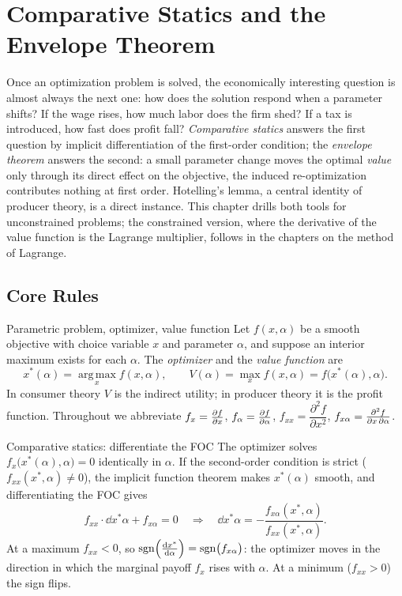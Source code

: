 \chapter{Comparative Statics and the Envelope Theorem}

Once an optimization problem is solved, the economically interesting
question is almost always the next one: how does the solution respond when
a parameter shifts? If the wage rises, how much labor does the firm shed?
If a tax is introduced, how fast does profit fall? \emph{Comparative
statics} answers the first question by implicit
differentiation of the first-order condition; the \emph{envelope theorem} answers the second: a small parameter change
moves the optimal \emph{value} only through its direct effect on the
objective, the induced re-optimization contributes nothing at first
order. Hotelling's lemma, a central identity of producer theory, is a
direct instance. This chapter drills both tools for unconstrained
problems; the constrained version, where the derivative of the value
function is the Lagrange multiplier, follows in the chapters on the method
of Lagrange.

\section{Core Rules}

\begin{rulebox}{Parametric problem, optimizer, value function}
Let $f(x,\alpha)$ be a smooth objective with choice variable $x$ and
parameter $\alpha$, and suppose an interior maximum exists for each
$\alpha$. The \emph{optimizer} and the \emph{value function} are
\[
  x^*(\alpha)=\operatorname*{arg\,max}_x f(x,\alpha), \qquad
  V(\alpha)=\max_x f(x,\alpha)=f\bigl(x^*(\alpha),\alpha\bigr).
\]
In consumer theory $V$ is the indirect utility; in producer theory it is the profit
function. Throughout we abbreviate
$f_x=\frac{\partial f}{\partial x}$, $f_\alpha=\frac{\partial f}{\partial \alpha}$,
$f_{xx}=\dfrac{\partial^{2}f}{\partial x^{2}}$,
$f_{x\alpha}=\frac{\partial^{2} f}{\partial x\,\partial \alpha}$.
\end{rulebox}

\begin{rulebox}{Comparative statics: differentiate the FOC}
The optimizer solves $f_x\bigl(x^*(\alpha),\alpha\bigr)=0$ identically in
$\alpha$. If the second-order condition is strict
($f_{xx}(x^*,\alpha)\neq0$), the implicit function theorem makes
$x^*(\alpha)$ smooth, and differentiating the FOC gives
\[
  f_{xx}\cdot\dd{x^*}{\alpha}+f_{x\alpha}=0
  \quad\Longrightarrow\quad
  \dd{x^*}{\alpha}=-\frac{f_{x\alpha}(x^*,\alpha)}{f_{xx}(x^*,\alpha)}.
\]
At a maximum $f_{xx}<0$, so
$\operatorname{sgn}\Bigl(\frac{\mathrm{d}x^*}{\mathrm{d}\alpha}\Bigr)=\operatorname{sgn}\bigl(f_{x\alpha}\bigr)$: the
optimizer moves in the direction in which the marginal payoff $f_x$ rises
with $\alpha$. At a minimum ($f_{xx}>0$) the sign flips.
\end{rulebox}

